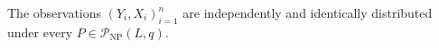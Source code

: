 The observations \((Y_i,X_i)_{i=1}^n\) are independently and identically distributed under every \(P\in\mathcal P_{\mathrm{NP}}(L,q)\).
